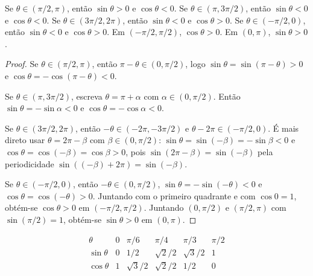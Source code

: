 \documentclass[11pt,a4paper]{article}
\begin{document}
\begin{proposicao}\label{prop:quadrantes}
Se $\theta\in(\pi/2,\pi)$, então $\sin\theta>0$ e $\cos\theta<0$. Se $\theta\in(\pi,3\pi/2)$, então $\sin\theta<0$ e $\cos\theta<0$. Se $\theta\in(3\pi/2,2\pi)$, então $\sin\theta<0$ e $\cos\theta>0$. Se $\theta\in(-\pi/2,0)$, então $\sin\theta<0$ e $\cos\theta>0$. Em $(-\pi/2,\pi/2)$, $\cos\theta>0$. Em $(0,\pi)$, $\sin\theta>0$.
\end{proposicao}

\begin{proof}
Se $\theta\in(\pi/2,\pi)$, então $\pi-\theta\in(0,\pi/2)$, logo $\sin\theta=\sin(\pi-\theta)>0$ e $\cos\theta=-\cos(\pi-\theta)<0$.

Se $\theta\in(\pi,3\pi/2)$, escreva $\theta=\pi+\alpha$ com $\alpha\in(0,\pi/2)$. Então $\sin\theta=-\sin\alpha<0$ e $\cos\theta=-\cos\alpha<0$.

Se $\theta\in(3\pi/2,2\pi)$, então $-\theta\in(-2\pi,-3\pi/2)$ e $\theta-2\pi\in(-\pi/2,0)$. É mais direto usar $\theta=2\pi-\beta$ com $\beta\in(0,\pi/2)$: $\sin\theta=\sin(-\beta)=-\sin\beta<0$ e $\cos\theta=\cos(-\beta)=\cos\beta>0$, pois $\sin(2\pi-\beta)=\sin(-\beta)$ pela periodicidade $\sin((-\beta)+2\pi)=\sin(-\beta)$.

Se $\theta\in(-\pi/2,0)$, então $-\theta\in(0,\pi/2)$, $\sin\theta=-\sin(-\theta)<0$ e $\cos\theta=\cos(-\theta)>0$. Juntando com o primeiro quadrante e com $\cos 0=1$, obtém-se $\cos\theta>0$ em $(-\pi/2,\pi/2)$. Juntando $(0,\pi/2)$ e $(\pi/2,\pi)$ com $\sin(\pi/2)=1$, obtém-se $\sin\theta>0$ em $(0,\pi)$.
\end{proof}

\begin{teorema}\label{teo:notaveis}
\[
\begin{array}{c|ccccc}
\theta&0&\pi/6&\pi/4&\pi/3&\pi/2\\
\hline
\sin\theta&0&1/2&\sqrt{2}/2&\sqrt{3}/2&1\\
\cos\theta&1&\sqrt{3}/2&\sqrt{2}/2&1/2&0
\end{array}
\]
\end{teorema}
\end{document}
